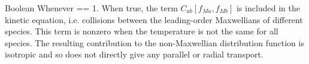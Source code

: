 %

\myhrule

{Boolean}
{\false}
{Whenever  == 1.}
{When true, the term $C_{ab}[ f_{Ma}, f_{Mb}]$ is included in the kinetic equation,
i.e. collisions between the leading-order Maxwellians of different species.  This term is nonzero
when the temperature is not the same for all species.  The resulting contribution to the non-Maxwellian
distribution function is isotropic and so does not directly give any parallel or radial transport.}

\myhrule

